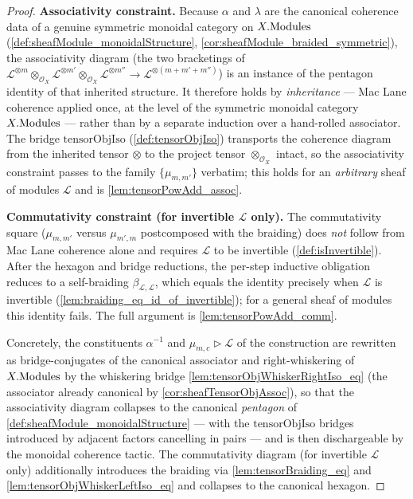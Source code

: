 \begin{proof}
  \textbf{Associativity constraint.} Because \(\alpha\) and \(\lambda\) are the
  canonical coherence data of a genuine symmetric monoidal category on
  \(X.\mathrm{Modules}\) (\cref{def:sheafModule_monoidalStructure},
  \cref{cor:sheafModule_braided_symmetric}), the associativity diagram (the two
  bracketings of \(\mathcal{L}^{\otimes m} \otimes_{\mathcal{O}_X}
  \mathcal{L}^{\otimes m'} \otimes_{\mathcal{O}_X} \mathcal{L}^{\otimes m''} \to
  \mathcal{L}^{\otimes (m+m'+m'')}\)) is an instance of the pentagon identity of
  that inherited structure. It therefore holds by \emph{inheritance} --- Mac Lane
  coherence applied once, at the level of the symmetric monoidal category
  \(X.\mathrm{Modules}\) --- rather than by a separate induction over a hand-rolled
  associator. The bridge \(\mathrm{tensorObjIso}\) (\cref{def:tensorObjIso})
  transports the coherence diagram from the inherited tensor \(\otimes\) to the
  project tensor \(\otimes_{\mathcal{O}_X}\) intact, so the associativity
  constraint passes to the family \(\{\mu_{m,m'}\}\) verbatim; this holds for an
  \emph{arbitrary} sheaf of modules \(\mathcal{L}\) and is \cref{lem:tensorPowAdd_assoc}.

  \textbf{Commutativity constraint (for invertible \(\mathcal{L}\) only).} The
  commutativity square (\(\mu_{m,m'}\) versus \(\mu_{m',m}\) postcomposed with the
  braiding) does \emph{not} follow from Mac Lane coherence alone and requires
  \(\mathcal{L}\) to be invertible (\cref{def:isInvertible}). After the hexagon and
  bridge reductions, the per-step inductive obligation reduces to a self-braiding
  \(\beta_{\mathcal{L},\mathcal{L}}\), which equals the identity precisely when
  \(\mathcal{L}\) is invertible (\cref{lem:braiding_eq_id_of_invertible}); for a
  general sheaf of modules this identity fails. The full argument is
  \cref{lem:tensorPowAdd_comm}.

  Concretely, the constituents \(\alpha^{-1}\) and \(\mu_{m,c} \rhd \mathcal{L}\)
  of the construction are rewritten as bridge-conjugates of the canonical associator
  and right-whiskering of \(X.\mathrm{Modules}\) by the whiskering bridge
  \cref{lem:tensorObjWhiskerRightIso_eq} (the associator already canonical by
  \cref{cor:sheafTensorObjAssoc}), so that the associativity diagram collapses to the
  canonical \emph{pentagon} of \cref{def:sheafModule_monoidalStructure} --- with the
  \(\mathrm{tensorObjIso}\) bridges introduced by adjacent factors cancelling in
  pairs --- and is then dischargeable by the \(\mathrm{monoidal}\) coherence tactic.
  The commutativity diagram (for invertible \(\mathcal{L}\) only) additionally
  introduces the braiding via \cref{lem:tensorBraiding_eq} and
  \cref{lem:tensorObjWhiskerLeftIso_eq} and collapses to the canonical hexagon.
\end{proof}

